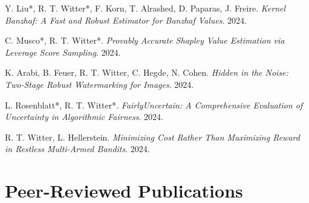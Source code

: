 \documentclass[11pt,a4paper,sans]{moderncv}
\begin{document}
\begin{enumerate}[label={[\arabic*]},align=left]
    \item Y. Liu*, R. T. Witter*, F. Korn, T. Alrashed, D. Paparas, J. Freire. \textit{Kernel Banzhaf: A Fast and Robust Estimator for Banzhaf Values}. 2024.
    \item C. Musco*, R. T. Witter*. \textit{Provably Accurate Shapley Value Estimation via Leverage Score Sampling}. 2024.
    \item K. Arabi, B. Feuer, R. T. Witter, C. Hegde, N. Cohen. \textit{Hidden in the Noise: Two-Stage Robust Watermarking for Images}. 2024.
    \item L. Rosenblatt*, R. T. Witter*. \textit{FairlyUncertain: A Comprehensive Evaluation of Uncertainty in Algorithmic Fairness}. 2024.
    \item R. T. Witter, L. Hellerstein. \textit{Minimizing Cost Rather Than Maximizing Reward in Restless Multi-Armed Bandits}. 2024.
\end{enumerate}


\section{Peer-Reviewed Publications}
\end{document}
